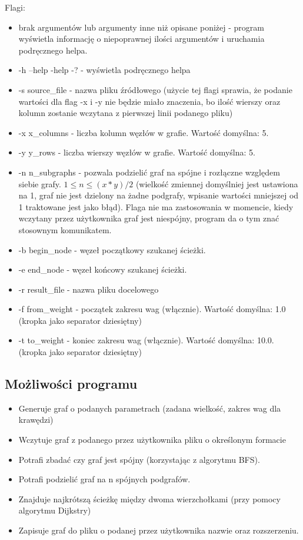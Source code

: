 \documentclass{article}
\begin{document}
\newpage
Flagi:
\begin{itemize}
    \item brak argumentów lub argumenty inne niż opisane poniżej - program wyświetla informację o niepoprawnej ilości argumentów i uruchamia podręcznego helpa.
    \item -h \textbar--help  \textbar-help \textbar-? - wyświetla podręcznego helpa
    \item -s source\_file - nazwa pliku źródłowego (użycie tej flagi sprawia, że podanie wartości dla flag -x i -y nie będzie miało znaczenia, bo ilość wierszy oraz kolumn zostanie wczytana z pierwszej linii podanego pliku)
    \item -x x\_columns - liczba kolumn węzłów w grafie. Wartość domyślna: 5.
    \item -y y\_rows - liczba wierszy węzłów w grafie. Wartość domyślna: 5.
    \item -n n\_subgraphs - pozwala podzielić graf na spójne i rozłączne względem siebie grafy. ${1 \leq n \leq (x*y)/2}$ (wielkość zmiennej domyślniej jest ustawiona na 1, graf nie jest dzielony na żadne podgrafy, wpisanie wartości mniejszej od 1 traktowane jest jako błąd). Flaga nie ma zastosowania w momencie, kiedy wczytany przez użytkownika graf jest niespójny, program da o tym znać stosownym komunikatem.
    \item -b begin\_node - węzeł początkowy szukanej ścieżki. 
    \item -e end\_node - węzeł końcowy szukanej ścieżki. 
    \item -r result\_file - nazwa pliku docelowego
    \item -f from\_weight - początek zakresu wag (włącznie). Wartość domyślna: 1.0 (kropka jako separator dziesiętny)
    \item -t to\_weight - koniec zakresu wag (włącznie). Wartość domyślna: 10.0. (kropka jako separator dziesiętny)
    
\end{itemize}
\subsection{Możliwości programu}
\begin{itemize}
    \item Generuje graf o podanych parametrach (zadana wielkość, zakres wag dla krawędzi)
    \item Wczytuje graf z podanego przez użytkownika pliku o określonym formacie
    \item Potrafi zbadać czy graf jest spójny (korzystając z algorytmu BFS).
    \item Potrafi podzielić graf na n spójnych podgrafów.
    \item Znajduje najkrótszą ścieżkę między dwoma wierzchołkami (przy pomocy algorytmu Dijkstry)
    \item Zapisuje graf do pliku o podanej przez użytkownika nazwie oraz rozszerzeniu.
\end{itemize}
\end{document}
